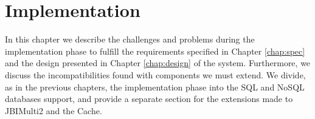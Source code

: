 \chapter{Implementation}
\label{chap:implementation}

In this chapter we describe the challenges and problems during the implementation phase to fulfill the requirements specified in Chapter \ref{chap:spec} and the design presented in Chapter \ref{chap:design} of the system. Furthermore, we discuss the incompatibilities found with components we must extend. We divide, as in the previous chapters, the implementation phase into the \ac{SQL} and \ac{NoSQL} databases support, and provide a separate section for the extensions made to JBIMulti2 and the Cache. 





